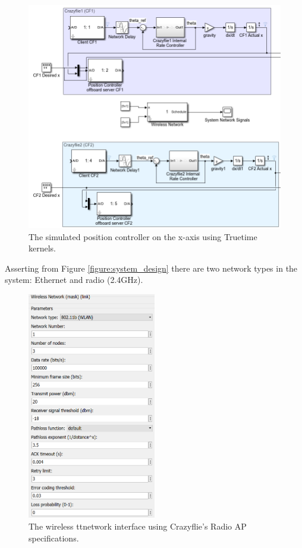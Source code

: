 \begin{figure}[H]
\centering
 \includegraphics[scale=0.6]{Figures/position_contr_sim.png}
 \caption{The simulated position controller on the x-axis using Truetime kernels.}
 \label{position_contr_simulink}
\end{figure}

Asserting from Figure \ref{figure:system_design} there are two network types in the system: Ethernet and radio (2.4GHz). 

\begin{figure}[H]
  \centering
    \includegraphics[width=0.5\textwidth]{Figures/network_interf.png}
  \caption{The wireless ttnetwork interface using Crazyflie's Radio AP specifications.}
  \label{figure:network_inter}
\end{figure} 

